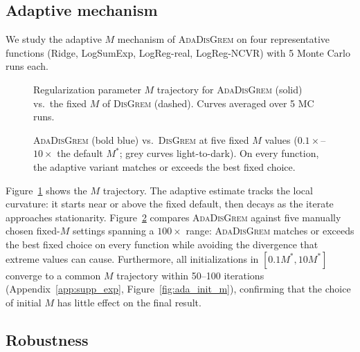 \documentclass[review,onefignum,onetabnum]{siamart171218}
\begin{document}
	\FloatBarrier
	\subsection{Adaptive mechanism}\label{ssec:ada}
	
	We study the adaptive $M$ mechanism of \textsc{AdaDisGrem} on four
	representative functions (Ridge, LogSumExp, LogReg-real, LogReg-NCVR)
	with 5 Monte Carlo runs each.

	\begin{figure}[htbp]
		\centering
		\caption{Regularization parameter $M$ trajectory for \textsc{AdaDisGrem}
			(solid) vs.\ the fixed $M$ of \textsc{DisGrem} (dashed).
			Curves averaged over 5 MC runs.}
		\label{fig:ada_trajectory}
	\end{figure}

	\begin{figure}[htbp]
		\centering
		\caption{\textsc{AdaDisGrem} (bold blue) vs.\ \textsc{DisGrem}
			at five fixed $M$ values
			($0.1\times$--$10\times$ the default $M^*$; grey curves
			light-to-dark).
			On every function, the adaptive variant matches or exceeds
			the best fixed choice.}
		\label{fig:ada_vs_fixed}
	\end{figure}

	Figure~\ref{fig:ada_trajectory} shows the $M$ trajectory.
	The adaptive estimate tracks the local curvature: it starts near
	or above the fixed default, then decays as the iterate approaches
	stationarity.
	Figure~\ref{fig:ada_vs_fixed} compares \textsc{AdaDisGrem} against
	five manually chosen fixed-$M$ settings spanning a $100\times$ range:
	\textsc{AdaDisGrem} matches or exceeds the best fixed choice on
	every function while avoiding the divergence that extreme values
	can cause.
	Furthermore, all initializations in $[0.1M^*,10M^*]$
	converge to a common $M$ trajectory within 50--100 iterations
	(Appendix~\ref{app:supp_exp}, Figure~\ref{fig:ada_init_m}),
	confirming that the choice of initial $M$ has little effect
	on the final result.
	
	\FloatBarrier
	\subsection{Robustness}\label{ssec:robust}
	
\end{document}
